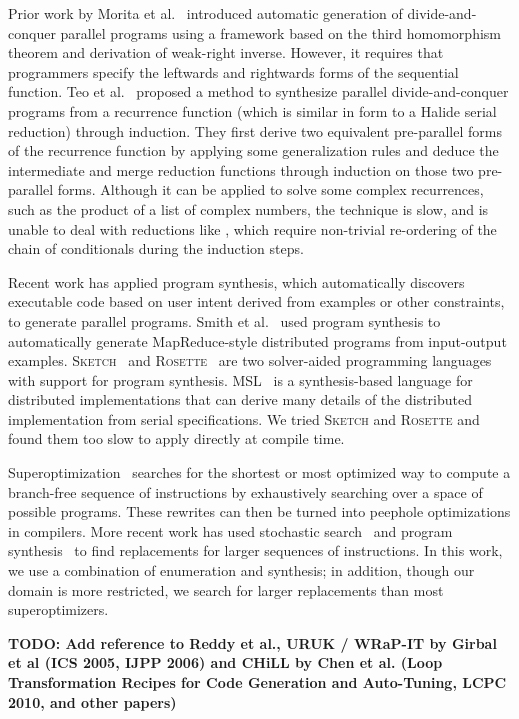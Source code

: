 Prior work by Morita et al.~\cite{Morita:2007:AIG:1250734.1250752} introduced automatic generation of divide-and-conquer parallel programs using a framework based on the third homomorphism theorem and derivation of weak-right inverse. However, it requires that programmers specify the leftwards and rightwards forms of the sequential function. Teo et al.~\cite{Teo:1997:DEP:266670.266697} proposed a method to synthesize parallel divide-and-conquer
programs from a recurrence function (which is similar in form to a Halide serial reduction) through induction. They first derive two equivalent pre-parallel forms of the recurrence function by applying some generalization rules and deduce the intermediate and merge reduction functions through induction on those two pre-parallel forms. Although it can be applied to solve some complex recurrences, such as the product of a list of complex numbers, the technique is slow, and is unable to deal with reductions like , which require non-trivial re-ordering of the chain of conditionals during the induction steps.

Recent work has applied program synthesis, which automatically discovers executable code based on user intent derived from examples or other constraints, to generate parallel programs. Smith et al.~\cite{Smith:2016:MPS:2908080.2908102} used program synthesis to automatically generate MapReduce-style distributed programs from input-output examples. \textsc{Sketch}~\cite{Solar-Lezama:2008:PSS:1714168} and \textsc{Rosette}~\cite{Torlak:2013:GSL:2509578.2509586} are two solver-aided programming languages with support for program synthesis.  MSL~\cite{Xu:2014:MSE:2683593.2683628} is a synthesis-based language for distributed implementations that can derive many details of the distributed implementation from serial specifications. We tried \textsc{Sketch} and \textsc{Rosette} and found them too slow to apply directly at compile time.

Superoptimization~\cite{Granlund:1992:EBU:143095.143146, Massalin:1987:SLS:36206.36194} searches for the shortest or most optimized way to compute a branch-free sequence of instructions by exhaustively searching over a space of possible programs. These rewrites can then be turned into peephole optimizations in compilers. More recent work has used stochastic search~\cite{Phothilimthana:2016:SUS:2872362.2872387, Schkufza:2013:SS:2490301.2451150} and program synthesis~\cite{Lopes:2015:PCP:2737924.2737965} to find replacements for larger sequences of instructions.
In this work, we use a combination of enumeration and synthesis; in addition, though our domain is more restricted, we search for larger replacements than most superoptimizers.

\textbf{TODO: Add reference to Reddy et al., URUK / WRaP-IT by Girbal et al (ICS 2005, IJPP 2006)
and CHiLL by Chen et al. (Loop Transformation Recipes for Code
Generation and Auto-Tuning, LCPC 2010, and other papers)}
